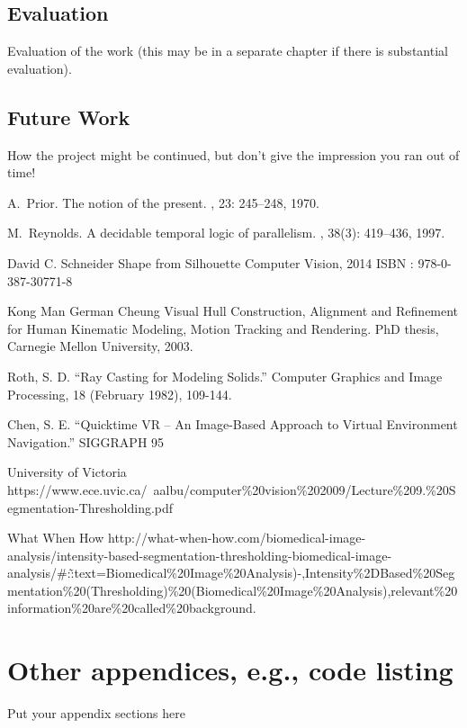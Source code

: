 \documentclass[a4paper]{report}
\begin{document}
\section{Evaluation}
Evaluation of the work (this may be in a separate chapter if there is substantial evaluation).

\section{Future Work}
How the project might be continued, but don't give the impression you ran out of time!

\appendix


\begin{thebibliography}{HHM99}


A.~Prior.
\newblock The notion of the present.
, 23:  245--248, 1970.


M.~Reynolds.
\newblock A decidable temporal logic of parallelism.
, 38(3):  419--436,
  1997.


David C. Schneider
\newblock  Shape from Silhouette
Computer Vision, 2014
ISBN : 978-0-387-30771-8



Kong Man German Cheung
\newblock    Visual Hull Construction, Alignment and Refinement for Human Kinematic Modeling, Motion Tracking and Rendering. 
\newblock PhD thesis, Carnegie Mellon University, 2003.

Roth, S. D. 
\newblock “Ray Casting for Modeling Solids.” 
\newblock Computer Graphics and Image Processing, 18 (February 1982), 109-144.

Chen, S. E. 
\newblock “Quicktime VR – An Image-Based Approach to Virtual
Environment Navigation.” SIGGRAPH 95

University of Victoria
\newblock https://www.ece.uvic.ca/~aalbu/computer\%20vision\%202009/Lecture\%209.\%20Segmentation-Thresholding.pdf

What When How
\newblock http://what-when-how.com/biomedical-image-analysis/intensity-based-segmentation-thresholding-biomedical-image-analysis/\#:\~:text=Biomedical\%20Image\%20Analysis)-,Intensity\%2DBased\%20Segmentation\%20(Thresholding)\%20(Biomedical\%20Image\%20Analysis),relevant\%20information\%20are\%20called\%20background.
\end{thebibliography}
\chapter{Other appendices, e.g., code listing}
Put your appendix sections here
\end{document}

